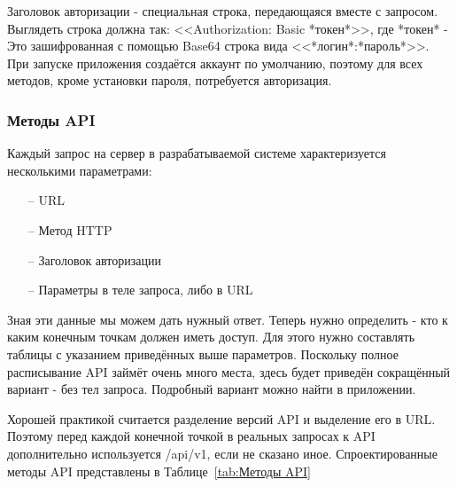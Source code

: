\documentclass[a4paper,article]{article}
\begin{document}
    Заголовок авторизации - специальная строка, передающаяся вместе с запросом. Выглядеть строка должна так: <<Authorization: Basic *токен*>>, где *токен* - Это зашифрованная с помощью Base64 строка вида <<*логин*:*пароль*>>. При запуске приложения создаётся аккаунт по умолчанию, поэтому для всех методов, кроме установки пароля, потребуется авторизация.

    \subsubsection{Методы API}

    Каждый запрос на сервер в разрабатываемой системе характеризуется несколькими параметрами:

    \begin{itemize}[nolistsep]
        \item[--] URL
        \item[--] Метод HTTP
        \item[--] Заголовок авторизации
        \item[--] Параметры в теле запроса, либо в URL
    \end{itemize}

    Зная эти данные мы можем дать нужный ответ. Теперь нужно определить - кто к каким конечным точкам должен иметь доступ. Для этого нужно составлять таблицы с указанием приведённых выше параметров. Поскольку полное расписывание API займёт очень много места, здесь будет приведён сокращённый вариант - без тел запроса. Подробный вариант можно найти в приложении.

    Хорошей практикой считается разделение версий API и выделение его в URL. Поэтому перед каждой конечной точкой в реальных запросах к API дополнительно используется /api/v1, если не сказано иное. Спроектированные методы API представлены в Таблице~\ref{tab:Методы API}
\end{document}
